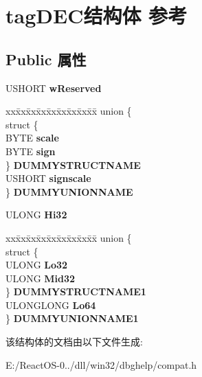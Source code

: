 \hypertarget{structtag_d_e_c}{}\section{tag\+D\+E\+C结构体 参考}
\label{structtag_d_e_c}
\subsection*{Public 属性}
\begin{DoxyCompactItemize}
\item 
\mbox{\label{structtag_d_e_c_a5d6834e69403bb0165dd0ee340beceab}} 
U\+S\+H\+O\+RT {\bfseries w\+Reserved}
\item 
\mbox{\label{structtag_d_e_c_a7dbad3f656b43fec79fd28ec2a5fb024}} 
\begin{tabbing}
xx\=xx\=xx\=xx\=xx\=xx\=xx\=xx\=xx\=\kill
union \{\\
\>struct \{\\
\>\>BYTE {\bfseries scale}\\
\>\>BYTE {\bfseries sign}\\
\>\} {\bfseries DUMMYSTRUCTNAME}\\
\>USHORT {\bfseries signscale}\\
\} {\bfseries DUMMYUNIONNAME}\\

\end{tabbing}\item 
\mbox{\label{structtag_d_e_c_a0a925e68ac0d854e5c8597fba56c7ce0}} 
U\+L\+O\+NG {\bfseries Hi32}
\item 
\mbox{\label{structtag_d_e_c_a14c982e6521dafc13050440ebe41968e}} 
\begin{tabbing}
xx\=xx\=xx\=xx\=xx\=xx\=xx\=xx\=xx\=\kill
union \{\\
\>struct \{\\
\>\>ULONG {\bfseries Lo32}\\
\>\>ULONG {\bfseries Mid32}\\
\>\} {\bfseries DUMMYSTRUCTNAME1}\\
\>ULONGLONG {\bfseries Lo64}\\
\} {\bfseries DUMMYUNIONNAME1}\\

\end{tabbing}\end{DoxyCompactItemize}


该结构体的文档由以下文件生成\+:\begin{DoxyCompactItemize}
\item 
E\+:/\+React\+O\+S-\/0../dll/win32/dbghelp/compat.\+h\end{DoxyCompactItemize}
